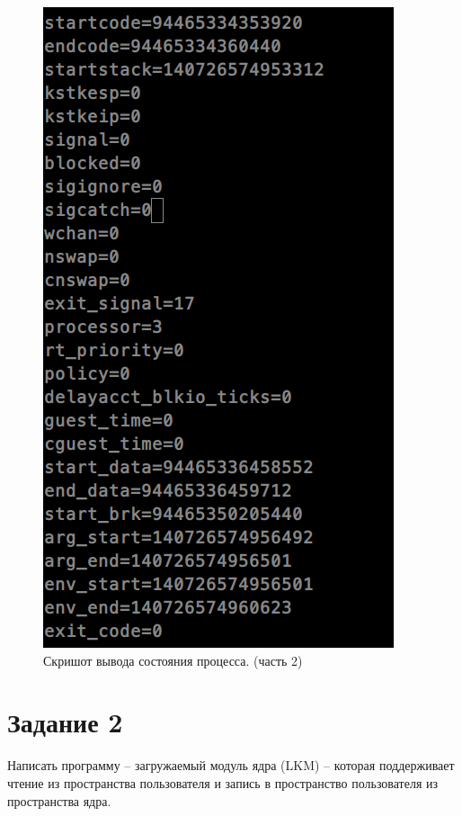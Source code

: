 \begin{figure}[H]
    \centering
    \includegraphics[scale=0.45]{data/image/stat_2.png}
    \caption{Скришот вывода состояния процесса. (часть 2)}
\end{figure}

\section{Задание \No{}2}
Написать программу – загружаемый модуль ядра (LKM) – которая поддерживает чтение из пространства пользователя и запись в пространство пользователя из пространства ядра.

